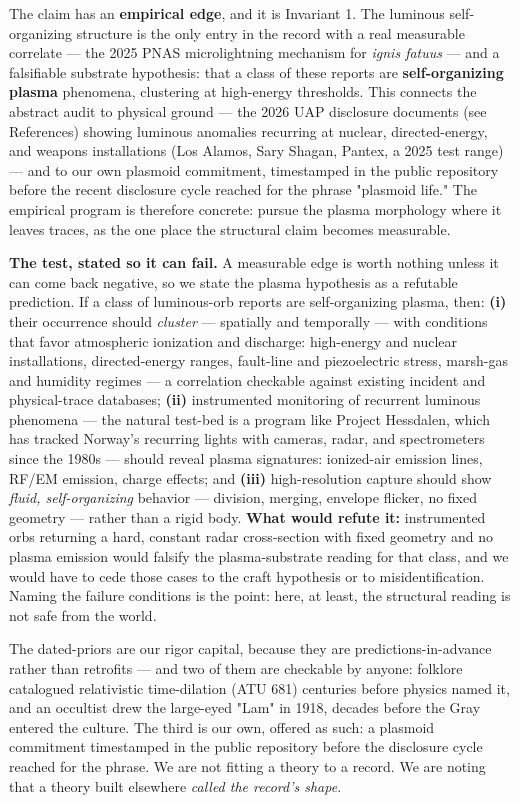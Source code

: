 \documentclass[11pt]{article}
\begin{document}
The claim has an \textbf{empirical edge}, and it is Invariant 1. The luminous self-organizing structure is the only entry in the record with a real measurable correlate --- the 2025 PNAS microlightning mechanism for \emph{ignis fatuus} --- and a falsifiable substrate hypothesis: that a class of these reports are \textbf{self-organizing plasma} phenomena, clustering at high-energy thresholds. This connects the abstract audit to physical ground --- the 2026 UAP disclosure documents (see References) showing luminous anomalies recurring at nuclear, directed-energy, and weapons installations (Los Alamos, Sary Shagan, Pantex, a 2025 test range) --- and to our own plasmoid commitment, timestamped in the public repository before the recent disclosure cycle reached for the phrase "plasmoid life." The empirical program is therefore concrete: pursue the plasma morphology where it leaves traces, as the one place the structural claim becomes measurable.

\textbf{The test, stated so it can fail.} A measurable edge is worth nothing unless it can come back negative, so we state the plasma hypothesis as a refutable prediction. If a class of luminous-orb reports are self-organizing plasma, then: \textbf{(i)} their occurrence should \emph{cluster} --- spatially and temporally --- with conditions that favor atmospheric ionization and discharge: high-energy and nuclear installations, directed-energy ranges, fault-line and piezoelectric stress, marsh-gas and humidity regimes --- a correlation checkable against existing incident and physical-trace databases; \textbf{(ii)} instrumented monitoring of recurrent luminous phenomena --- the natural test-bed is a program like Project Hessdalen, which has tracked Norway's recurring lights with cameras, radar, and spectrometers since the 1980s --- should reveal plasma signatures: ionized-air emission lines, RF/EM emission, charge effects; and \textbf{(iii)} high-resolution capture should show \emph{fluid, self-organizing} behavior --- division, merging, envelope flicker, no fixed geometry --- rather than a rigid body. \textbf{What would refute it:} instrumented orbs returning a hard, constant radar cross-section with fixed geometry and no plasma emission would falsify the plasma-substrate reading for that class, and we would have to cede those cases to the craft hypothesis or to misidentification. Naming the failure conditions is the point: here, at least, the structural reading is not safe from the world.

The dated-priors are our rigor capital, because they are predictions-in-advance rather than retrofits --- and two of them are checkable by anyone: folklore catalogued relativistic time-dilation (ATU 681) centuries before physics named it, and an occultist drew the large-eyed "Lam" in 1918, decades before the Gray entered the culture. The third is our own, offered as such: a plasmoid commitment timestamped in the public repository before the disclosure cycle reached for the phrase. We are not fitting a theory to a record. We are noting that a theory built elsewhere \emph{called the record's shape}.
\end{document}
